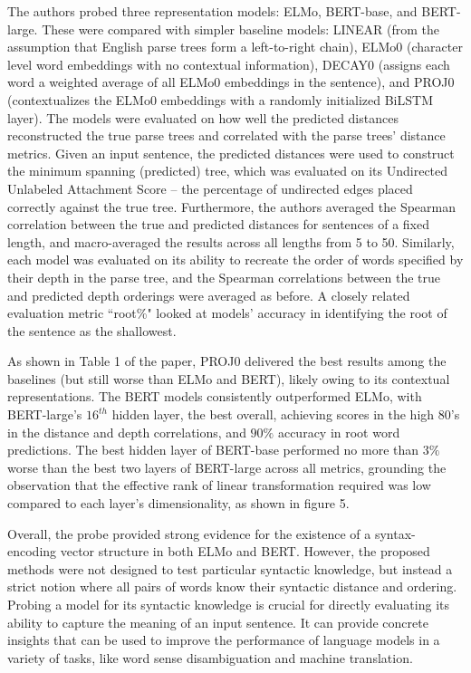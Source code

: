 \documentclass[11pt]{article}
\begin{document}
The authors probed three representation models: 
ELMo, BERT-base, and BERT-large. 
These were compared with simpler baseline 
models: LINEAR (from the assumption
that English parse trees form a left-to-right
chain), ELMo0 (character level word embeddings with no contextual information), 
DECAY0 (assigns each word a weighted average
of all ELMo0 embeddings in the sentence), 
and PROJ0 (contextualizes the ELMo0 embeddings
with a randomly initialized BiLSTM layer).
The models were evaluated on how well the predicted
distances reconstructed the true parse trees 
and correlated with the parse trees’
distance metrics. Given an input sentence, the predicted distances
were used to construct the minimum spanning (predicted) tree, 
which was evaluated on its Undirected Unlabeled Attachment Score – 
the percentage of undirected edges placed correctly
against the true tree. Furthermore, the authors
averaged the Spearman correlation between 
the true and predicted distances for 
sentences of a fixed length,
and macro-averaged the results
across all lengths from 5 to 50.
Similarly, each model was evaluated
on its ability to recreate the order of words 
specified by their depth in the parse tree,
and the Spearman correlations between
the true and predicted depth orderings
were averaged as before. 
A closely related evaluation metric ``root\%"
looked at models’ accuracy in identifying the 
root of the sentence as the shallowest.


As shown in Table 1 of the paper, 
PROJ0 delivered the best results among the baselines (but still worse than ELMo and BERT),
likely owing to its contextual representations.
The BERT models consistently outperformed ELMo, with BERT-large's $16^{th}$ hidden layer,
the best overall, achieving scores in the high $80$'s in the distance and depth correlations, and $90\%$ accuracy in root word predictions.
The best hidden layer of BERT-base
performed no more than $3\%$ worse than the best two layers of BERT-large
across all metrics, grounding the observation that the 
effective rank of linear transformation required 
was low compared to each layer's dimensionality, as shown in figure 5.

Overall, the probe provided strong evidence for the existence of a
syntax-encoding vector structure in both ELMo and BERT. However, the 
proposed methods were not designed to test particular syntactic knowledge,
but instead a strict notion where all pairs of words know their syntactic distance and ordering. 
Probing a model for its syntactic knowledge is crucial 
for directly evaluating its ability to capture the meaning of 
an input sentence. It can provide concrete insights that 
can be used to improve the performance of language models in a variety of tasks,
like word sense disambiguation and machine translation.
\end{document}
